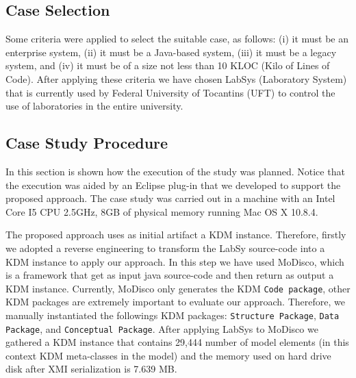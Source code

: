 \subsection{Case Selection}

Some criteria were applied to select the suitable case, as follows: (i) it must be an enterprise system, (ii) it must be a Java-based system, (iii) it must be a legacy system, and (iv) it must be of a size not less than 10 KLOC (Kilo of Lines of Code). After applying these criteria we have chosen LabSys (Laboratory System) that is currently used by Federal University of Tocantins (UFT) to control the use of laboratories in the entire university. 

\subsection{Case Study Procedure}\label{sec:caseStudyProcedure}

In this section is shown how the execution of the study was planned. Notice that the execution was aided by an Eclipse plug-in that we developed to support the proposed approach. The case study was carried out in a machine with an Intel Core I5 CPU 2.5GHz, 8GB of physical memory running Mac OS X 10.8.4.

The proposed approach uses as initial artifact a KDM instance. Therefore, firstly we adopted a reverse engineering to  transform the LabSy source-code into a KDM instance to apply our approach. In this step we have used MoDisco\cite{Brunele20141012}, which is a framework that get as input java source-code and then return as output a KDM instance. Currently, MoDisco only generates the KDM \texttt{Code package}, other KDM packages are extremely important to evaluate our approach. Therefore, we manually instantiated the followings KDM packages: \texttt{Structure Package}, \texttt{Data Package}, and \texttt{Conceptual Package}. After applying LabSys to MoDisco we gathered a KDM instance that contains 29,444 number of model elements (in this context KDM meta-classes in the model) and the memory used on hard drive disk after XMI serialization is 7.639 MB. 


